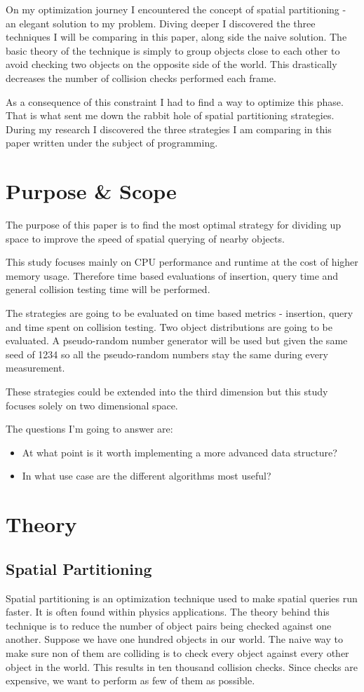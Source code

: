 \documentclass[a4paper, 12pt]{article}
\begin{document}
On my optimization journey I encountered the concept of spatial partitioning -
an elegant solution to my problem. Diving deeper I discovered the three
techniques I will be comparing in this paper, along side the naive solution. The
basic theory of the technique is simply to group objects close to each other to
avoid checking two objects on the opposite side of the world. This drastically
decreases the number of collision checks performed each frame.

As a consequence of this constraint I had to find a way to optimize this phase.
That is what sent me down the rabbit hole of spatial partitioning strategies.
During my research I discovered the three strategies I am comparing in this
paper written under the subject of programming.

\section{Purpose \& Scope}
The purpose of this paper is to find the most optimal strategy for dividing up
space to improve the speed of spatial querying of nearby objects.

This study focuses mainly on CPU performance and runtime at the cost of higher
memory usage. Therefore time based evaluations of insertion, query time and
general collision testing time will be performed.

The strategies are going to be evaluated on time based metrics - insertion,
query and time spent on collision testing. Two object distributions are going
to be evaluated. A pseudo-random number generator will be used but given the
same seed of 1234 so all the pseudo-random numbers stay the same during every
measurement.

These strategies could be extended into the third dimension but this study
focuses solely on two dimensional space.

The questions I'm going to answer are:
\begin{itemize}
    \item At what point is it worth implementing a more advanced data structure?
    \item In what use case are the different algorithms most useful?
\end{itemize}

\section{Theory}
\subsection{Spatial Partitioning}
Spatial partitioning is an optimization technique used to make spatial queries
run faster. It is often found within physics applications. The theory behind
this technique is to reduce the number of object pairs being checked against
one another. Suppose we have one hundred objects in our world. The naive way to
make sure non of them are colliding is to check every object against every other
object in the world. This results in ten thousand collision checks. Since checks
are expensive, we want to perform as few of them as possible.
\end{document}
